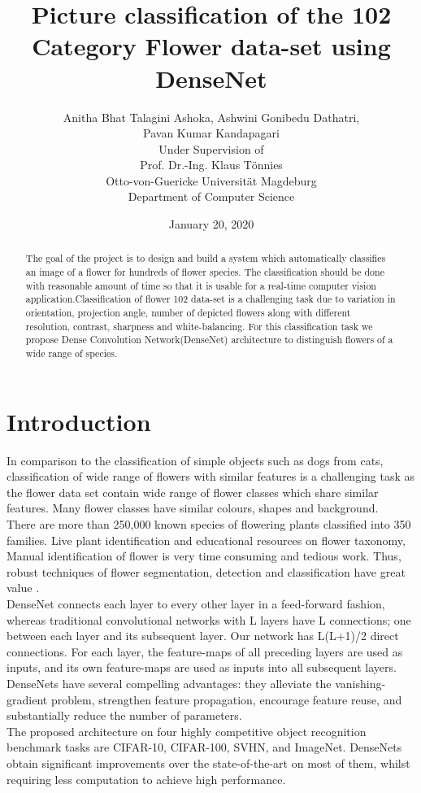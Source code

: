 \documentclass[a4paper,19pt]{article}
\title{Picture classification of the 102 Category Flower data-set using DenseNet
 \\ [0.5cm]}
\author{Anitha Bhat Talagini Ashoka, Ashwini Gonibedu Dathatri, \\Pavan Kumar Kandapagari\\
[1.5cm]
    Under Supervision of \\
    Prof. Dr.-Ing. Klaus Tönnies \\
    Otto-von-Guericke Universität Magdeburg\\
		Department of Computer Science}}
\date{January 20, 2020}
\begin{document}
\begin{abstract}
{\selectfont
The goal of the project is to design and build a system which automatically classifies an image of a flower for hundreds of flower species. The classification should be done with reasonable amount of time so that it is usable for a real-time computer vision application.Classification of flower 102 data-set is a challenging task due to variation in orientation, projection angle, number of depicted flowers along with different  resolution, contrast, sharpness and white-balancing. For this classification task we propose Dense Convolution Network(DenseNet) architecture to distinguish flowers of a wide range of species.}
\end{abstract}

\section{Introduction}
In comparison to the classification of simple objects such as dogs from cats, classification of wide range of flowers with similar features is a challenging task as the flower data set contain wide range of flower classes which share similar features. Many flower classes have similar colours, shapes and background.  
\\There are more than 250,000 known species of flowering plants
classified into 350 families. Live plant identification and educational resources on flower taxonomy, Manual identification of flower is very time consuming and tedious work. Thus, robust techniques of flower segmentation, detection and classification have great value \cite{DBLP:journals/corr/HuangLW16a}.
\\DenseNet connects each layer to every other layer in a feed-forward fashion, whereas traditional convolutional networks with L layers have L connections; one between each layer and its subsequent layer. Our network has L(L+1)/2 direct connections. For each layer, the feature-maps of all preceding layers are used as inputs, and its own feature-maps are used as inputs into all subsequent layers. DenseNets have several compelling advantages: they alleviate the vanishing-gradient problem, strengthen feature propagation, encourage feature reuse, and substantially reduce the number of parameters.
\\The proposed architecture on four highly competitive object recognition benchmark tasks are CIFAR-10, CIFAR-100, SVHN, and ImageNet. DenseNets obtain significant improvements over the state-of-the-art on most of them, whilst requiring less computation to achieve high performance.
\end{document}
